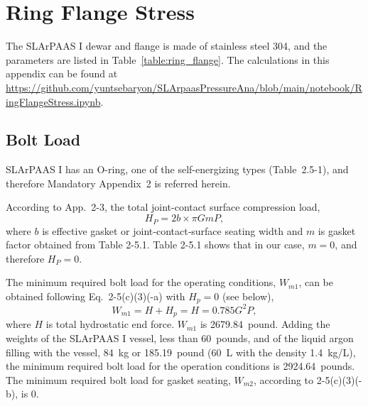 \section{Ring Flange Stress}
\label{app:ring_flange}


The SLArPAAS I dewar and flange is made of stainless steel 304,
and the parameters are listed in Table~\ref{table:ring_flange}.
The calculations in this appendix can be found at
\url{https://github.com/yuntsebaryon/SLArpaasPressureAna/blob/main/notebook/RingFlangeStress.ipynb}.\\



\subsection{Bolt Load}
\label{app:bolt_load}

SLArPAAS I has an O-ring, one of the self-energizing types (Table~2.5-1),
and therefore Mandatory Appendix~2 is referred herein.

According to App.~2-3, the total joint-contact surface compression load,
\begin{equation}
    H_P = 2b\times \pi GmP,
\end{equation}
where $b$ is effective gasket or joint‐contact‐surface seating width
and $m$ is gasket factor obtained from Table 2-5.1.
Table 2-5.1 shows that in our case, $m = 0$, and therefore $H_P = 0$.

The minimum required bolt load for the operating conditions,
$W_{m1}$, can be obtained following Eq.~2-5(c)(3)(-a) with $H_p = 0$ (see below),
\begin{equation}
    W_{m1} = H + H_p = H = 0.785G^2 P,
\end{equation}
where $H$ is total hydrostatic end force.
$W_{m1}$ is 2679.84~pound.
Adding the weights of the SLArPAAS I vessel, less than 60~pounds,
and of the liquid argon filling with the vessel, 84~kg or 185.19~pound
(60~L with the density 1.4~kg/L),
the minimum required bolt load for the operation conditions is 2924.64~pounds.\\

The minimum required bolt load for gasket seating, $W_{m2}$, according to
2-5(c)(3)(-b), is 0.

